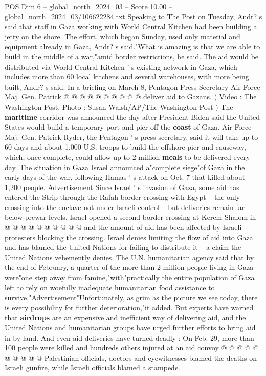 \begin{textsample}{POS Dim 6 – global\_north\_2024\_03 – Score 10.00 – global\_north\_2024\_03/106622284.txt}
Speaking to The Post on Tuesday, Andr? s said that staff in Gaza working with World Central Kitchen had been building a jetty on the shore.
The effort, which began Sunday, used only material and equipment already in Gaza, Andr? s said."What is amazing is that we are able to build in the middle of a war,"amid border restrictions, he said.
The aid would be distributed via World Central Kitchen ' s existing network in Gaza, which includes more than 60 local kitchens and several warehouses, with more being built, Andr? s said.
In a briefing on March 8, Pentagon Press Secretary Air Force Maj.
Gen.
Patrick @ @ @ @ @ @ @ @ @ @ deliver aid to Gazans. ( Video : The Washington Post, Photo : Susan Walsh/AP/The Washington Post ) The \textbf{maritime} corridor was announced the day after President Biden said the United States would build a temporary port and pier off the \textbf{coast} of Gaza.
Air Force Maj.
Gen.
Patrick Ryder, the Pentagon ' s press secretary, said it will take up to 60 days and about 1,000 U.S. troops to build the offshore pier and causeway, which, once complete, could allow up to 2 million \textbf{meals} to be delivered every day.
The situation in Gaza Israel announced a"complete siege"of Gaza in the early days of the war, following Hamas ' s attack on Oct. 7 that killed about 1,200 people.
Advertisement Since Israel ' s invasion of Gaza, some aid has entered the Strip through the Rafah border crossing with Egypt -- the only crossing into the enclave not under Israeli control -- but deliveries remain far below prewar levels.
Israel opened a second border crossing at Kerem Shalom in @ @ @ @ @ @ @ @ @ @ and the amount of aid has been affected by Israeli protesters blocking the crossing.
Israel denies limiting the flow of aid into Gaza and has blamed the United Nations for failing to distribute it -- a claim the United Nations vehemently denies.
The U.N. humanitarian agency said that by the end of February, a quarter of the more than 2 million people living in Gaza were"one step away from famine,"with"practically the entire population of Gaza left to rely on woefully inadequate humanitarian food assistance to survive."Advertisement"Unfortunately, as grim as the picture we see today, there is every possibility for further deterioration,"it added.
But experts have warned that \textbf{airdrops} are an expensive and inefficient way of delivering aid, and the United Nations and humanitarian groups have urged further efforts to bring aid in by land.
And even aid deliveries have turned deadly : On Feb. 29, more than 100 people were killed and hundreds others injured at an aid convoy @ @ @ @ @ @ @ @ @ @ Palestinian officials, doctors and eyewitnesses blamed the deaths on Israeli gunfire, while Israeli officials blamed a stampede.

\end{textsample}
